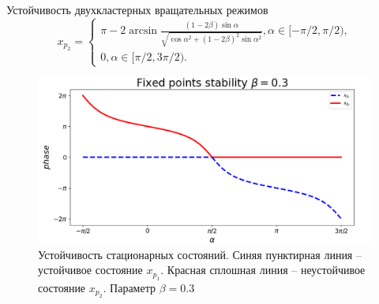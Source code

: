 \begin{chapter}{Устойчивость двухкластерных вращательных режимов}
	\begin{equation} \label{x2}
	x_{p_2} = \begin{cases}
		\pi - 2\arcsin{\frac{(1 - 2\beta) \sin{\alpha}}{\sqrt{\cos{\alpha}^2 + (1 - 2\beta)^2\sin{\alpha}^2}}}, \alpha \in [-\pi/2, \pi/2), \\
		0, \alpha \in [\pi/2, 3\pi/2).
		\end{cases}
	\end{equation}
	\begin{figure}[h!]\center		
		\includegraphics[width=1\columnwidth]{pictures/fixed-points.png} 
		\caption{Устойчивость стационарных состояний.
		Синяя пунктирная линия -- устойчивое состояние $x_{p_1}$.
		Красная сплошная линия -- неустойчивое состояние $x_{p_2}$.
		Параметр $\beta = 0.3$}
		\label{fp-2}
	\end{figure}


\end{chapter}
